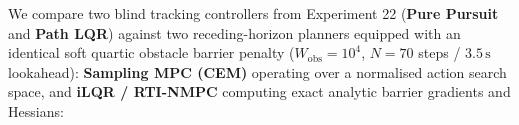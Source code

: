 \documentclass[11pt,a4paper]{article}
\begin{document}
We compare two blind tracking controllers from Experiment 22 (\textbf{Pure Pursuit} and \textbf{Path LQR}) against two receding-horizon planners equipped with an identical soft quartic obstacle barrier penalty ($W_{\text{obs}} = 10^4$, $N=70$ steps / $3.5\,\text{s}$ lookahead): \textbf{Sampling MPC (CEM)} operating over a normalised action search space, and \textbf{iLQR / RTI-NMPC} computing exact analytic barrier gradients and Hessians:

\begin{table}[H]
\centering
\small
{}
\caption{Benchmark results for Experiment 25: Differential-drive moving-obstacle avoidance (from \texttt{experiments/25\_diffdrive\_moving\_obstacle/table.md}).}
\label{tab:exp25}
\end{table}
\end{document}

